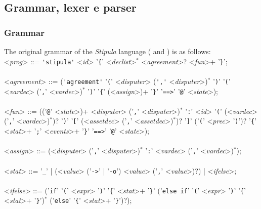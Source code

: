 \subsection{Grammar, lexer e parser}

\subsubsection{Grammar}
\label{grammar}

The original grammar of the \textit{Stipula} language (\cite{site:stipula-java-centralized-grammar} and 
\cite{site:stipula-java-centralized-syntax}) is as follows:
{
  \small
  \\
  \noindent
  <\textit{prog}> ::= \verb|'stipula'| <\textit{id}> '\verb|{|' <\textit{declist}>$^*$ <\textit{agreement}>? <\textit{fun}>+ '\verb|}|';
  \\\\
  \noindent
  <\textit{agreement}> ::= (\verb|'agreement'| '\verb|(|' <\textit{disputer}> (\verb|','| <\textit{disputer}>)$^*$ '\verb|)|' '\verb|(|' <\textit{vardec}> ('\verb|,|' <\textit{vardec}>)$^*$ '\verb|)|' '\verb|{|' (<\textit{assign}>)+ '\verb|}|' '\verb|==>|' '\verb|@|' <\textit{state}>);
  \\\\
  \noindent
  <\textit{fun}> ::= (('\verb|@|' <\textit{state}>)+ <\textit{disputer}> ('\verb|,|' <\textit{disputer}>)$^*$ '\verb|:|' <\textit{id}> '\verb|(|' (<\textit{vardec}> ('\verb|,|' <\textit{vardec}>)$^*$)? '\verb|)|' '\verb|[|' (<\textit{assetdec}> ('\verb|,|' <\textit{assetdec}>)$^*$)? '\verb|]|' ('\verb|(|' <\textit{prec}> '\verb|)|')? '\verb|{|' <\textit{stat}>+ '\verb|;|' <\textit{events}>+ '\verb|}|' '\verb|==>|' '\verb|@|' <\textit{state}>);
  \\\\
  \noindent
  <\textit{assign}> ::= (<\textit{disputer}> ('\verb|,|' <\textit{disputer}>)$^*$ '\verb|:|' <\textit{vardec}> ('\verb|,|' <\textit{vardec}>)$^*$);
  \\\\
  \noindent
  <\textit{stat}> ::= '\verb|_|' | (<\textit{value}> ('\verb|->|' | '\verb|-o|') <\textit{value}> ('\verb|,|' <\textit{value}>)?) | <\textit{ifelse}>;
  \\\\
  \noindent
  <\textit{ifelse}> ::= ('\verb|if|' '\verb|(|' <\textit{expr}> '\verb|)|' '\verb|{|' <\textit{stat}>+ '\verb|}|' ('\verb|else if|' '\verb|(|' <\textit{expr}> '\verb|)|' '\verb|{|' <\textit{stat}>+ '\verb|}|')$^*$ ('\verb|else|' '\verb|{|' <\textit{stat}>+ '\verb|}|')?);
}
